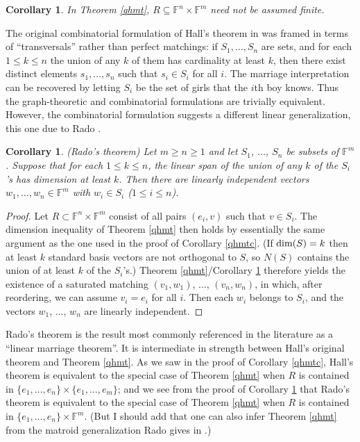 \documentclass{amsart}
\newtheorem{cor}[thm]{Corollary}
\theoremstyle{definition}
\begin{document}
\begin{cor}\label{imp}
In Theorem \ref{qhmt}, $R \subseteq \mathbb{F}^n\times \mathbb{F}^m$ need not be assumed finite.
\end{cor}

The original combinatorial formulation of Hall's theorem in \cite{hall} was framed in terms of ``transversals'' rather than perfect matchings: if $S_1, \ldots, S_n$ are sets, and for each $1 \leq k \leq n$ the union of any $k$ of them has cardinality at least $k$, then there exist distinct elements $s_1, \ldots, s_n$ such that $s_i \in S_i$ for all $i$. The marriage interpretation can be recovered by letting $S_i$ be the set of girls that the $i$th boy knows. Thus the graph-theoretic and combinatorial formulations are trivially equivalent. However, the combinatorial formulation suggests a different linear generalization, this one due to Rado \cite[Theorem 1]{rado}.

\begin{cor}\label{qhmtr} (Rado's theorem)
Let $m \geq n \geq 1$ and let $S_1$, $\ldots$, $S_n$ be subsets of $\mathbb{F}^m$. Suppose that for each $1 \leq k \leq n$, the linear span of the union of any $k$ of the $S_i$'s has dimension at least $k$. Then there are linearly independent vectors $w_1, \ldots, w_n \in \mathbb{F}^m$ with $w_i \in S_i$ ($1 \leq i \leq n$).
\end{cor}

\begin{proof}
Let $R \subset \mathbb{F}^n\times \mathbb{F}^m$ consist of all pairs $(e_i, v)$ such that $v \in S_i$. The dimension inequality of Theorem \ref{qhmt} then holds by essentially the same argument as the one used in the proof of Corollary \ref{qhmtc}. (If ${\rm dim}(S) = k$ then at least $k$ standard basis vectors are not orthogonal to $S$, so $N(S)$ contains the union of at least $k$ of the $S_i$'s.) Theorem \ref{qhmt}/Corollary \ref{imp} therefore yields the existence of a saturated matching $(v_1, w_1)$, $\ldots$, $(v_n,w_n)$, in which, after reordering, we can assume $v_i = e_i$ for all $i$. Then each $w_i$ belongs to $S_i$, and the vectors $w_1$, $\ldots$, $w_n$ are linearly independent.
\end{proof}

Rado's theorem is the result most commonly referenced in the literature as a ``linear marriage theorem''. It is intermediate in strength between Hall's original theorem and Theorem \ref{qhmt}. As we saw in the proof of Corollary \ref{qhmtc}, Hall's theorem is equivalent to the special case of Theorem \ref{qhmt} when $R$ is contained in $\{e_1, \ldots, e_n\} \times \{e_1, \ldots, e_m\}$; and we see from the proof of Corollary \ref{qhmtr} that Rado's theorem is equivalent to the special case of Theorem \ref{qhmt} when $R$ is contained in $\{e_1, \ldots, e_n\} \times \mathbb{F}^m$. (But I should add that one can also infer Theorem \ref{qhmt} from the matroid generalization Rado gives in \cite[Theorem 3]{rado}.)
\end{document}
